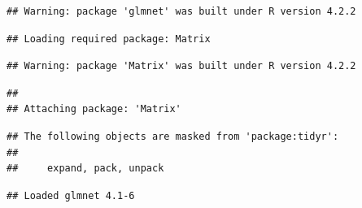 \documentclass[
]{article}
\newenvironment{Shaded}{\begin{snugshade}}{\end{snugshade}}
\newcommand{\AttributeTok}[1]{\textcolor[rgb]{0.77,0.63,0.00}{#1}}
\newcommand{\CommentTok}[1]{\textcolor[rgb]{0.56,0.35,0.01}{\textit{#1}}}
\newcommand{\ConstantTok}[1]{\textcolor[rgb]{0.00,0.00,0.00}{#1}}
\newcommand{\DecValTok}[1]{\textcolor[rgb]{0.00,0.00,0.81}{#1}}
\newcommand{\FunctionTok}[1]{\textcolor[rgb]{0.00,0.00,0.00}{#1}}
\newcommand{\NormalTok}[1]{#1}
\newcommand{\OtherTok}[1]{\textcolor[rgb]{0.56,0.35,0.01}{#1}}
\newcommand{\SpecialCharTok}[1]{\textcolor[rgb]{0.00,0.00,0.00}{#1}}
\newcommand{\StringTok}[1]{\textcolor[rgb]{0.31,0.60,0.02}{#1}}
\begin{document}
\begin{verbatim}
## Warning: package 'glmnet' was built under R version 4.2.2
\end{verbatim}

\begin{verbatim}
## Loading required package: Matrix
\end{verbatim}

\begin{verbatim}
## Warning: package 'Matrix' was built under R version 4.2.2
\end{verbatim}

\begin{verbatim}
## 
## Attaching package: 'Matrix'
\end{verbatim}

\begin{verbatim}
## The following objects are masked from 'package:tidyr':
## 
##     expand, pack, unpack
\end{verbatim}

\begin{verbatim}
## Loaded glmnet 4.1-6
\end{verbatim}

\begin{Shaded}
\end{Shaded}
\end{document}
